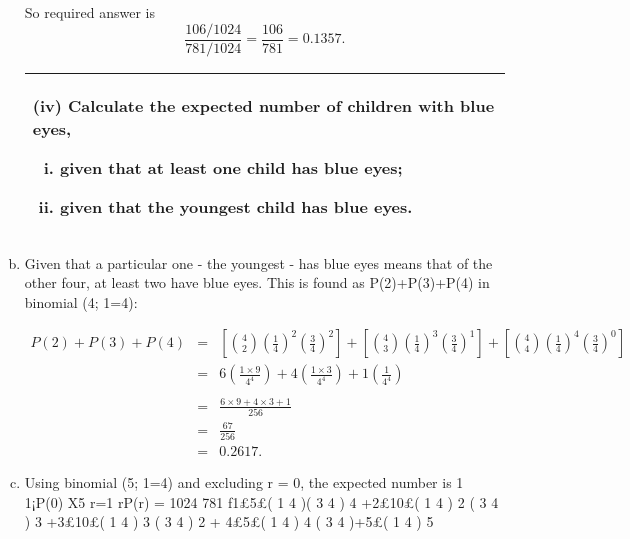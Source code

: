 \documentclass[a4paper,12pt]{article}
\begin{document}
\begin{enumerate}[(a)]
So required answer is \[ \frac{106/1024}{781/1024} = \frac{106}{781} = 0.1357. \]

\newpage
  \begin{table}[ht!]
     \centering
     \begin{tabular}{|p{15cm}|}
     \hline  
(iv) Calculate the expected number of children with blue eyes,
\begin{enumerate}[(i)]
\item given that at least one child has blue eyes;
\item given that the youngest child has blue eyes.
\end{enumerate}
\\ \hline
      \end{tabular}
    \end{table}
\item Given that a particular one - the youngest - has blue eyes means that of the
other four, at least two have blue eyes. This is found as P(2)+P(3)+P(4) in
binomial (4; 1=4): 

\begin{eqnarray*} 
P(2)+P(3)+P(4) &=& 
\left[ { 4 \choose 2}
\left( \frac{1}{4} \right) ^2 \left(\frac{3}{4}\right)^2 \right]+ 
\left[ { 4 \choose 3}
\left( \frac{1}{4} \right) ^3  \left(\frac{3}{4}\right)^1 \right]
+\left[ { 4 \choose 4}
\left( \frac{1}{4} \right) ^4  \left(\frac{3}{4}\right)^{0} \right]
\\ &=& 6 \left(\frac{1 \times 9}{4^4}\right) + 4 \left(\frac{1 \times 3}{4^4}\right) + 1 \left(\frac{1}{4^4}\right)\\
\\ &=&  \frac{6\times 9+4 \times 3+1}{256}    \\
 &=& \frac{67}{256} \\
 &=& 0.2617.
\end{eqnarray*}

\item  Using binomial (5; 1=4) and excluding r = 0, the expected number is
1
1¡P(0)
X5
r=1
rP(r) =
1024
781
f1£5£(
1
4
)(
3
4
)
4
+2£10£(
1
4
)
2
(
3
4
)
3
+3£10£(
1
4
)
3
(
3
4
)
2
+
4£5£(
1
4
)
4
(
3
4
)+5£(
1
4
)
5




\end{enumerate}
\end{document}
